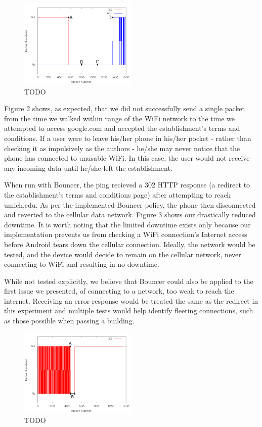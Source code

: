 \begin{figure}
	\includegraphics[width=0.5\textwidth]{paneraNoPolicy}
	\caption{TODO}
\end{figure}

Figure 2 shows, as expected, that we did not successfully send a single packet from the time we walked within range of the WiFi network to the time we attempted to access google.com and accepted the establishment's terms and conditions. If a user were to leave his/her phone in his/her pocket - rather than checking it as impulsively as the authors - he/she may never notice that the phone has connected to unusable WiFi. In this case, the user would not receive any incoming data until he/she left the establishment.

When run with Bouncer, the ping recieved a 302 HTTP response (a redirect to the establishment's terms and conditions page) after attempting to reach umich.edu. As per the implemented Bouncer policy, the phone then disconnected and reverted to the cellular data network. Figure 3 shows our drastically reduced downtime. It is worth noting that the limited downtime exists only because our implementation prevents us from checking a WiFi connection's Internet access before Android tears down the cellular connection. Ideally, the network would be tested, and the device would decide to remain on the cellular network, never connecting to WiFi and resulting in no downtime.

While not tested explicitly, we believe that Bouncer could also be applied to the first issue we presented, of connecting to a network, too weak to reach the internet. Receiving an error response would be treated the same as the redirect in this experiment and multiple tests would help identify fleeting connections, such as those possible when passing a building.

\begin{figure}
	\includegraphics[width=0.5\textwidth]{paneraWithPolicy}
	\caption{TODO}
\end{figure}

